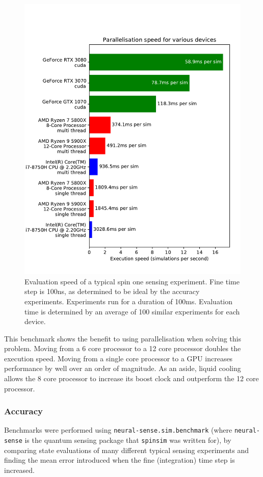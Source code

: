\documentclass{jors}
\begin{document}
			\begin{figure}[h!]
				\includegraphics[scale=0.9]{benchmark_device_aggregate_publication.pdf}
				\caption{Evaluation speed of a typical spin one sensing experiment. Fine time step is 100ns, as determined to be ideal by the accuracy experiments. Experiments run for a duration of 100ms. Evaluation time is determined by an average of 100 similar experiments for each device.}
				\label{fig:benchmark_device_aggregate}
			\end{figure}

			This benchmark shows the benefit to using parallelisation when solving this problem. Moving from a 6 core processor to a 12 core processor doubles the execution speed. Moving from a single core processor to a GPU increases performance by well over an order of magnitude. As an aside, liquid cooling allows the 8 core processor to increase its boost clock and outperform the 12 core processor.

		\subsubsection*{Accuracy}
			Benchmarks were performed using \texttt{neural-sense.sim.benchmark} (where \texttt{neural-sense} \cite{alexander-tritt-monash_alexander-tritt-monashneural-sense_2020} is the quantum sensing package that \texttt{spinsim} was written for), by comparing state evaluations of many different typical sensing experiments and finding the mean error introduced when the fine (integration) time step is increased.
\end{document}
